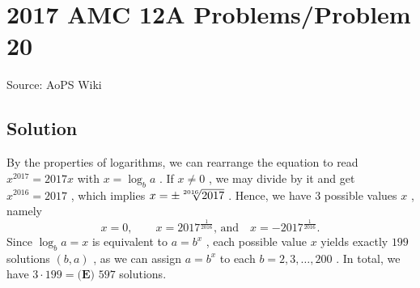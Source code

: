 \documentclass[12pt]{article}
\begin{document}
\section*{{2017 AMC 12A Problems/Problem 20}}
Source: AoPS Wiki

\subsection*{Solution}
By the properties of logarithms, we can rearrange the equation to read $x^{2017}=2017x$ with $x=\log_b a$ . If $x\neq 0$ , we may divide by it and get $x^{2016}=2017$ , which implies $x=\pm \root{2016}\of{2017}$ . Hence, we have $3$ possible values $x$ , namely \[x=0,\qquad x=2017^{\frac1{2016}},\, \text{and}\quad x=-2017^{\frac1{2016}}.\] Since $\log_b a=x$ is equivalent to $a=b^x$ , each possible value $x$ yields exactly $199$ solutions $(b,a)$ , as we can assign $a=b^x$ to each $b=2,3,\dots,200$ . In total, we have $3\cdot 199=\boxed{\textbf{(E) } 597}$ solutions.
\end{document}
